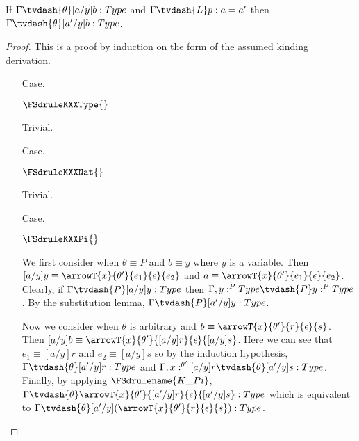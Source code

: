 \begin{lemma}
  \label{lemma:kinding_conversion}
  If $\Gamma \tvdash{\theta} [a/y]b:Type$ and $\Gamma \tvdash{L} p:a = a'$ then
  $\Gamma \tvdash{\theta} [a'/y]b:Type$.
\end{lemma}
\begin{proof}
  This is a proof by induction on the form of the assumed kinding derivation.
  \begin{itemize}
  \item[Case.] \ \\
    \begin{center}
      $\FSdruleKXXType{}$ 
    \end{center}
    Trivial.
    
  \item[Case.] \ \\
    \begin{center}
      $\FSdruleKXXNat{}$
    \end{center}
    Trivial.
    
  \item[Case.] \ \\
    \begin{center}
      $\FSdruleKXXPi{}$
    \end{center}
    We first consider when $\theta \equiv P$ and $b \equiv y$ where $y$ is a variable.  Then
    $[a/y]y \equiv \arrowT{x}{\theta'}{e_1}{\epsilon}{e_2}$ and 
    $a \equiv \arrowT{x}{\theta'}{e_1}{\epsilon}{e_2}$.  Clearly, if 
    $\Gamma \tvdash{P} [a/y]y:Type$ then $\Gamma, y:^P Type \tvdash{P} y:^P Type$.  By
    the substitution lemma, $\Gamma \tvdash{P} [a'/y]y:Type$.

    Now we consider when $\theta$ is arbitrary and 
    $b \equiv \arrowT{x}{\theta'}{r}{\epsilon}{s}$.
    Then $[a/y]b \equiv \arrowT{x}{\theta'}{[a/y]r}{\epsilon}{[a/y]s}$.  Here we can see that
    $e_1 \equiv [a/y]r$ and $e_2 \equiv [a/y]s$ so by the induction 
    hypothesis, $\Gamma \tvdash{\theta} [a'/y]r:Type$ and 
    $\Gamma, x:^{\theta'} [a/y]r \tvdash{\theta} [a'/y]s:Type$.  Finally, by applying 
    $\FSdrulename{K\_Pi}$, 
    $\Gamma \tvdash{\theta} \arrowT{x}{\theta'}{[a'/y]r}{\epsilon}{[a'/y]s}:Type$ which is 
    equivalent to 
    $\Gamma \tvdash{\theta} [a'/y](\arrowT{x}{\theta'}{r}{\epsilon}{s}):Type$.
  

\end{itemize}
\end{proof}
